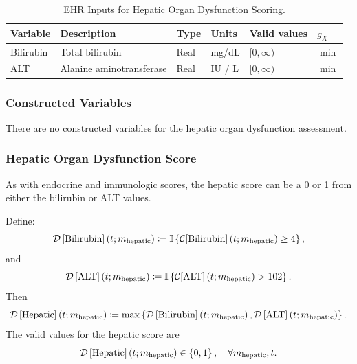 \documentclass[letterpaper,10pt]{article}
\begin{document}
\begin{table}
  \centering
  \caption{EHR Inputs for Hepatic Organ Dysfunction Scoring.}
  \label{tab:hepatic-ehr}
  \small
  \begin{tabular}{llllll}
    \toprule
    \textbf{Variable} &
    \textbf{Description} &
    \textbf{Type} &
    \textbf{Units} &
    \textbf{Valid values} &
    \textbf{$g_X$} \\
    \midrule

    \rowcolor{gray!20}
    Bilirubin &
    Total bilirubin &
    Real &
    mg/dL &
    $[0, \infty)$ &
    $\min$ \\
    ALT &
    Alanine aminotransferase &
    Real &
    IU / L &
    $[0, \infty)$ &
    $\min$ \\
    \bottomrule
  \end{tabular}
\end{table}

\subsubsection{Constructed Variables}\label{sec:hepatic-constructed}
There are no constructed variables for the hepatic organ dysfunction assessment.

\subsubsection{Hepatic Organ Dysfunction Score}\label{sec:hepatic-odss}

As with endocrine and immunologic scores, the hepatic score can be a 0 or 1 from
either the bilirubin or ALT values.

Define:
\begin{equation}
  \label{eq:bilirubin}
  \DS{Bilirubin}[\m{hepatic}] \coloneqq \mathbb{I} \left\{\CF{Bilirubin}[\m{hepatic}] \geq 4 \right\},
\end{equation}
and
\begin{equation}
  \label{eq:alt}
  \DS{ALT}[\m{hepatic}] \coloneqq \mathbb{I}\left\{ \CF{ALT}[\m{hepatic}] > 102 \right\}.
\end{equation}
Then
\begin{equation}
  \label{eq:hepatic}
  \DS{Hepatic}[\m{hepatic}] \coloneqq
  \max \left\{
    \DS{Bilirubin}[\m{hepatic}],
    \DS{ALT}[\m{hepatic}]
    \right\}.
\end{equation}
The valid values for the hepatic score are
\begin{equation}
  \label{eq:hepatic-valid-values}
  \DS{Hepatic}[\m{hepatic}] \in \left\{0, 1\right\}, \quad
  \forall \m{hepatic}, t.
\end{equation}
\end{document}
